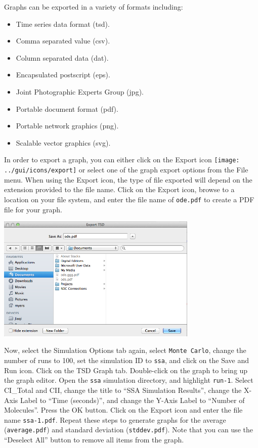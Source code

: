 \documentclass[titlepage,11pt]{article}
\begin{document}
Graphs can be exported in a variety of formats including:
\begin{itemize}
\item Time series data format (tsd).
\item Comma separated value (csv).
\item Column separated data (dat).
\item Encapsulated postscript (eps). 
\item Joint Photographic Experts Group (jpg). 
\item Portable document format (pdf).
\item Portable network graphics (png). 
\item Scalable vector graphics (svg).
\end{itemize}
In order to export a graph, you can either click on the Export icon \texttt{[image: ../gui/icons/export]} or select one of the graph export options from the File menu.  When using the Export icon, the type of file exported will depend on the extension provided to the file name.  Click on the Export icon, browse to a location on your file system, and enter the file name of {\tt ode.pdf} to create a PDF file for your graph.

\begin{center}
\includegraphics[height=60mm]{screenshots/exportTSD}
\end{center}

Now, select the Simulation Options tab again, select {\tt Monte Carlo}, change the number of runs to 100, set the simulation ID to {\tt ssa}, and click on the Save and Run icon.  Click on the TSD Graph tab.  Double-click on the graph to bring up the graph editor.  Open the {\tt ssa} simulation directory, and highlight {\tt run-1}.  Select CI\_Total and CII, change the title to ``SSA Simulation Results'', change the X-Axis Label to ``Time (seconds)'', and change the Y-Axis Label to ``Number of Molecules''.  Press the OK button.  Click on the Export icon and enter the file name {\tt ssa-1.pdf}.  Repeat these steps to generate graphs for the average ({\tt average.pdf}) and standard deviation ({\tt stddev.pdf}).  Note that you can use the ``Deselect All'' button to remove all items from the graph.
\end{document}

